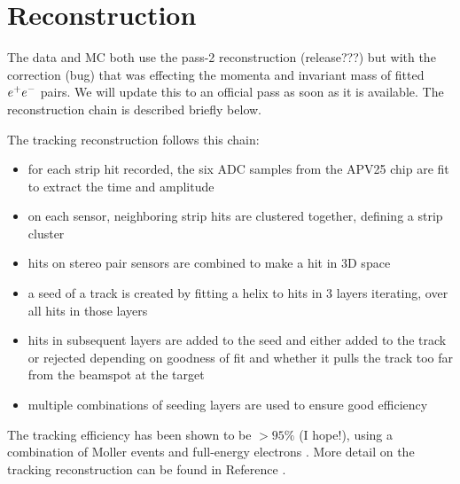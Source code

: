 \documentclass[twoside]{article}
\begin{document}



\section{Reconstruction}

The data and MC both use the pass-2 reconstruction (release???)  but with the correction (bug) that was effecting the momenta and invariant mass of fitted $e^+e^-$ pairs.  We will update this to an official pass as soon as it is available.  The reconstruction chain is described briefly below. 

The tracking reconstruction follows this chain: 
\begin{itemize}
\item for each strip hit recorded, the six ADC samples from the APV25 chip are fit to extract the time and amplitude
\item on each sensor, neighboring strip hits are clustered together, defining a strip cluster
\item hits on stereo pair sensors are combined to make a hit in 3D space
\item a seed of a track is created by fitting a helix to hits in 3 layers iterating, over all hits in those layers
\item hits in subsequent layers are added to the seed and either added to the track or rejected depending on goodness of fit and whether it pulls the track too far from the beamspot at the target
\item multiple combinations of seeding layers are used to ensure good efficiency
\end{itemize}
The tracking efficiency has been shown to be $>95\%$ (I hope!), using a combination of Moller events and full-energy electrons \cite{effNote}. More detail on the tracking reconstruction can be found in Reference \cite{trackingNote}.
\end{document}
